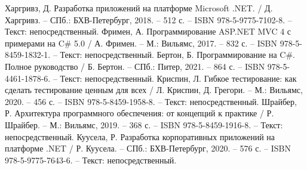 \begin{thebibliography}{9}
	 Харгривз, Д. Разработка приложений на платформе Microsoft .NET. / Д. Харгривз. – СПб.: БХВ-Петербург, 2018. – 512 с. – ISBN 978-5-9775-7102-8. – Текст: непосредственный.
	 Фримен, А. Программирование ASP.NET MVC 4 с примерами на C\# 5.0 / А. Фримен. – М.: Вильямс, 2017. – 832 с. – ISBN 978-5-8459-1832-1. – Текст: непосредственный.
	 Бертон, Б. Программирование на C\#. Полное руководство / Б. Бертон. – СПб.: Питер, 2021. – 864 с. – ISBN 978-5-4461-1878-6. – Текст: непосредственный.
	 Криспин, Л. Гибкое тестирование: как сделать тестирование ценным для всех / Л. Криспин, Д. Грегори. – М.: Вильямс, 2020. – 456 с. – ISBN 978-5-8459-1958-8. – Текст: непосредственный.
	 Шрайбер, Р. Архитектура программного обеспечения: от концепций к практике / Р. Шрайбер. – М.: Вильямс, 2019. – 368 с. – ISBN 978-5-8459-1916-8. – Текст: непосредственный.
	 Куусела, Р. Разработка корпоративных приложений на платформе .NET / Р. Куусела. – СПб.: БХВ-Петербург, 2020. – 576 с. – ISBN 978-5-9775-7643-6. – Текст: непосредственный.

\end{thebibliography}

